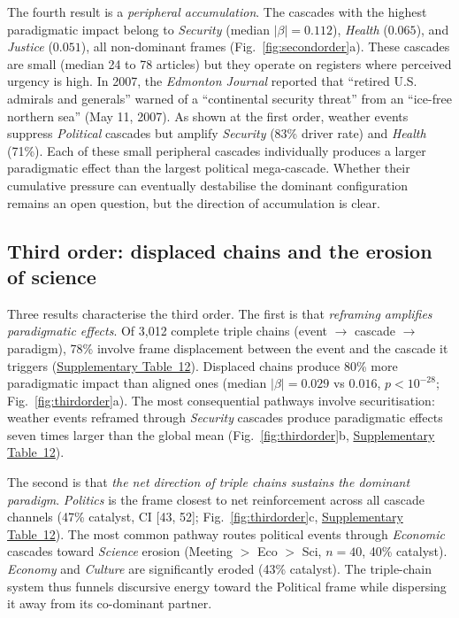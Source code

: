 \documentclass[11pt]{article}
\begin{document}
The fourth result is a \emph{peripheral accumulation}. The cascades with the highest paradigmatic impact belong to \emph{Security} (median $|\beta| = 0.112$), \emph{Health}\cite{pillodReframingClimateChange2021} ($0.065$), and \emph{Justice} ($0.051$), all non-dominant frames (Fig.~\ref{fig:secondorder}a). These cascades are small (median 24 to 78 articles) but they operate on registers where perceived urgency is high. In 2007, the \textit{Edmonton Journal} reported that ``retired U.S. admirals and generals'' warned of a ``continental security threat'' from an ``ice-free northern sea'' (May 11, 2007). As shown at the first order, weather events suppress \emph{Political} cascades but amplify \emph{Security} (83\% driver rate) and \emph{Health} (71\%). Each of these small peripheral cascades individually produces a larger paradigmatic effect than the largest political mega-cascade. Whether their cumulative pressure can eventually destabilise the dominant configuration remains an open question, but the direction of accumulation is clear.

\subsection*{Third order: displaced chains and the erosion of science}

Three results characterise the third order. The first is that \emph{reframing amplifies paradigmatic effects}. Of 3,012 complete triple chains (event $\to$ cascade $\to$ paradigm), 78\% involve frame displacement between the event and the cascade it triggers (\hyperref[tab:si_triple_stats]{Supplementary Table~12}). Displaced chains produce 80\% more paradigmatic impact than aligned ones (median $|\beta| = 0.029$ vs $0.016$, $p < 10^{-28}$; Fig.~\ref{fig:thirdorder}a). The most consequential pathways involve securitisation\cite{buzanSecurityNewFramework1998, detrazRethinkingEnvironmentalSecurity2009}: weather events reframed through \emph{Security} cascades produce paradigmatic effects seven times larger than the global mean (Fig.~\ref{fig:thirdorder}b, \hyperref[tab:si_triple_stats]{Supplementary Table~12}).

The second is that \emph{the net direction of triple chains sustains the dominant paradigm}. \emph{Politics} is the frame closest to net reinforcement across all cascade channels (47\% catalyst, CI [43, 52]; Fig.~\ref{fig:thirdorder}c, \hyperref[tab:si_triple_stats]{Supplementary Table~12}). The most common pathway routes political events through \emph{Economic} cascades toward \emph{Science} erosion (Meeting $>$ Eco $>$ Sci, $n = 40$, 40\% catalyst). \emph{Economy} and \emph{Culture} are significantly eroded (43\% catalyst). The triple-chain system thus funnels discursive energy toward the Political frame while dispersing it away from its co-dominant partner.
\end{document}
